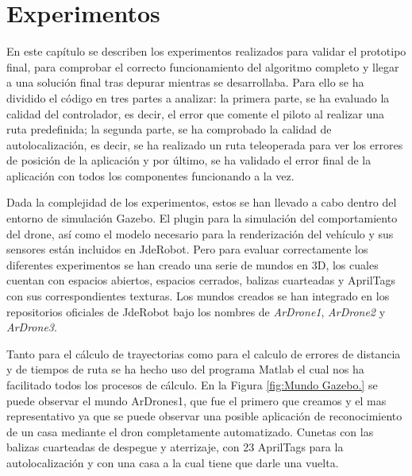 \chapter{Experimentos}\label{cap.experimentos}
\hspace{1cm} En este capítulo se describen los experimentos realizados para validar el prototipo final, para comprobar el correcto funcionamiento del algoritmo completo y llegar a una solución final tras depurar mientras se desarrollaba. Para ello se ha dividido el código en tres partes a analizar: la primera parte, se ha evaluado la calidad del controlador, es decir, el error que comente el piloto al realizar una ruta predefinida; la segunda parte, se ha comprobado la calidad de autolocalización, es decir, se ha realizado un ruta teleoperada para ver los errores de posición de la aplicación y por último, se ha validado el error final de la aplicación con todos los componentes funcionando a la vez.

\hspace{1cm} Dada la complejidad de los experimentos, estos se han llevado a cabo dentro del entorno de simulación Gazebo. El plugin para la simulación del comportamiento del drone, así como el modelo necesario para la renderización del vehículo y sus sensores están incluidos en JdeRobot. Pero para evaluar correctamente los diferentes experimentos se han creado una serie de mundos en 3D, los cuales cuentan con espacios abiertos, espacios cerrados, balizas cuarteadas y AprilTags con sus correspondientes texturas. Los mundos creados se han integrado en los repositorios oficiales de JdeRobot bajo los nombres de \textit{ArDrone1}, \textit{ArDrone2} y \textit{ArDrone3}.

\hspace{1cm} Tanto para el cálculo de trayectorias como para el calculo de errores de distancia y de tiempos de ruta se ha hecho uso del programa Matlab el cual nos ha facilitado todos los procesos de cálculo. En la Figura \ref{fig:Mundo Gazebo.} se puede observar el mundo ArDrones1, que fue el primero que creamos y el mas representativo ya que se puede observar una posible aplicación de reconocimiento de un casa mediante el dron completamente automatizado. Cunetas con las balizas cuarteadas de despegue y aterrizaje, con 23 AprilTags para la autolocalización y con una casa a la cual tiene que darle una vuelta.


